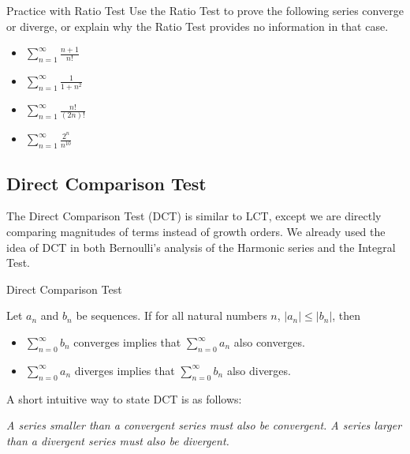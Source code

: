 \begin{exercise}{Practice with Ratio Test \Coffeecup \Coffeecup}
Use the Ratio Test to prove the following series converge or diverge, or explain why the Ratio Test provides no information in that case.
\begin{itemize}
\item $\sum_{n=1}^\infty \frac{n+1}{n!}$
\vspace*{1.5in}
\item  $\sum_{n=1}^\infty \frac{1}{1+n^2}$
\vspace*{1.5in} 
\item  $\sum_{n=1}^\infty \frac{n!}{(2n)!}$
\vspace*{1.5in} 
\item  $\sum_{n=1}^\infty \frac{2^n}{n^{10}}$
\vspace*{1.5in}
\end{itemize}
\end{exercise}

\subsection{Direct Comparison Test}

The Direct Comparison Test (DCT) is similar to LCT, except we are directly comparing magnitudes of terms instead of growth orders.  We already used the idea of DCT in both Bernoulli's analysis of the Harmonic series and the Integral Test. 

\begin{theorem}{Direct Comparison Test}

Let $a_n$ and $b_n$ be sequences.  If for all natural numbers $n$, $|a_n|\leq |b_n|$, then

\begin{itemize}

\item $\sum_{n=0}^\infty b_n$ converges implies that $\sum_{n=0}^\infty a_n$ also converges. 

\item $\sum_{n=0}^\infty a_n$ diverges implies that $\sum_{n=0}^\infty b_n$ also diverges. 
\end{itemize}
\end{theorem}

A short intuitive way to state DCT is as follows: \begin{center}
\emph{A series smaller than a convergent series must also be convergent.  A series larger than a divergent series must also be divergent.}
\end{center}

